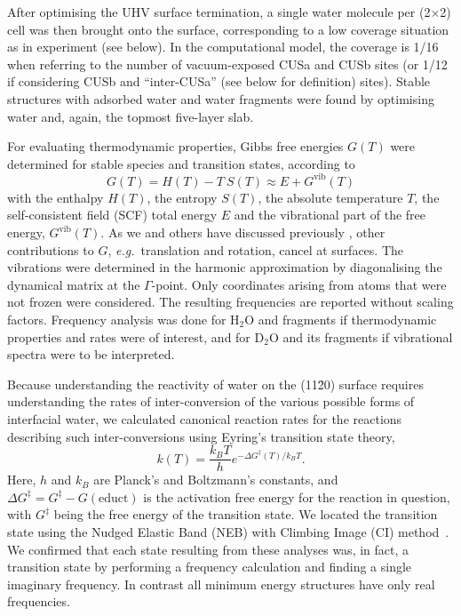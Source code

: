 \documentclass[twoside,twocolumn,9pt]{article}
\begin{document}
After optimising the UHV surface termination, a single water molecule per (2$\times$2) cell was then brought onto the surface, corresponding to a low coverage situation as in experiment (see below). In the computational model, the coverage is 1/16 when referring to the number of vacuum-exposed CUSa and CUSb sites (or 1/12 if considering CUSb and ``inter-CUSa'' (see below for definition) sites). Stable structures with adsorbed water and water fragments were found by optimising water and, again, the topmost five-layer slab.

For evaluating thermodynamic properties, Gibbs free energies $G(T)$ were determined for stable species and transition states, according to
\begin{equation}
 G(T) = H(T) - T \ S(T) \approx E + G^\mathrm{vib}(T)
\end{equation}
with the enthalpy $H(T)$, the entropy $S(T)$, the absolute temperature $T$, the self-consistent field (SCF) total energy $E$ and the vibrational part of the free energy, $ G^\mathrm{vib}(T)$. As we and others have discussed previously \cite{kirsch2014}, other contributions to $G$, \textit{e.g.}\ translation and rotation, cancel at surfaces. The vibrations were determined in the harmonic approximation by diagonalising the dynamical matrix at the $\Gamma$-point. Only coordinates arising from atoms that were not frozen were considered.
The resulting frequencies are reported without scaling factors. Frequency analysis was done for H$_2$O and fragments if thermodynamic properties and rates were of interest, and for D$_2$O and its fragments if vibrational spectra were to be interpreted.

Because understanding the reactivity of water on the (11\=20) surface requires understanding the rates of inter-conversion of the various possible forms of interfacial water, we calculated canonical reaction rates for the reactions describing such inter-conversions using Eyring's transition state theory, 
\begin{equation} 
 k(T)=\frac{k_BT}{h}e^{-\Delta G^{\ddagger}(T)/k_BT} .
\label{eyr}
\end{equation}
Here, $h$ and $k_B$ are Planck's and Boltzmann's constants, and $\Delta G^\ddagger=G^\ddagger-G(\mbox{educt})$ is the activation free energy for the reaction in question, with $G^\ddagger$ being the free energy of the transition state. We located the transition state using the Nudged Elastic Band (NEB) with Climbing Image (CI) method~\cite{Henkelman00b,climbing-image}. We confirmed that each state resulting from these analyses was, in fact, a transition state by performing a frequency calculation and finding a single imaginary frequency. In contrast all minimum energy structures have only real frequencies.
\end{document}
